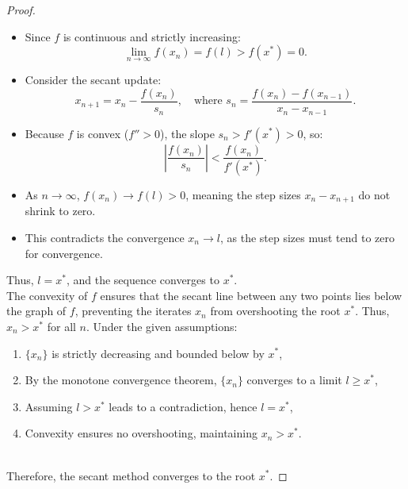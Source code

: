 \documentclass{article}
\begin{document}
\begin{proof}
    \begin{itemize}
        \item Since \( f \) is continuous and strictly increasing:
        \[
        \lim_{n \to \infty} f(x_n) = f(l) > f(x^\ast) = 0.
        \]
        \item Consider the secant update:
        \[
        x_{n+1} = x_n - \frac{f(x_n)}{s_n}, \quad \text{where } s_n = \frac{f(x_n) - f(x_{n-1})}{x_n - x_{n-1}}.
        \]
        \item Because \( f \) is convex (\( f'' > 0 \)), the slope \( s_n > f'(x^\ast) > 0 \), so:
        \[
        \left| \frac{f(x_n)}{s_n} \right| < \frac{f(x_n)}{f'(x^\ast)}.
        \]
        \item As \( n \to \infty \), \( f(x_n) \to f(l) > 0 \), meaning the step sizes \( x_n - x_{n+1} \) do not shrink to zero.
        \item This contradicts the convergence \( x_n \to l \), as the step sizes must tend to zero for convergence.
    \end{itemize}
    Thus, \( l = x^\ast \), and the sequence converges to \( x^\ast \).
    \\
    The convexity of \( f \) ensures that the secant line between any two points lies below the graph of \( f \), preventing the iterates \( x_n \) from overshooting the root \( x^\ast \). Thus, \( x_n > x^\ast \) for all \( n \).
    Under the given assumptions:
    \begin{enumerate}
        \item \( \{x_n\} \) is strictly decreasing and bounded below by \( x^\ast \),
        \item By the monotone convergence theorem, \( \{x_n\} \) converges to a limit \( l \geq x^\ast \),
        \item Assuming \( l > x^\ast \) leads to a contradiction, hence \( l = x^\ast \),
        \item Convexity ensures no overshooting, maintaining \( x_n > x^\ast \).
    \end{enumerate}
    \\
    Therefore, the secant method converges to the root \( x^\ast \).
\end{proof}

\newpage
\end{document}
